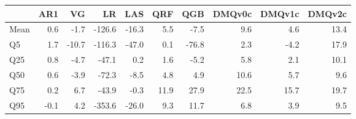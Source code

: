 \begin{tabular}{lrrrrrrrrr}
\toprule
 & AR1 & VG & LR & LAS & QRF & QGB & DMQv0c & DMQv1c & DMQv2c \\
\midrule
Mean & 0.6 & -1.7 & -126.6 & -16.3 & 5.5 & -7.5 & 9.6 & 4.6 & 13.4 \\
Q5 & 1.7 & -10.7 & -116.3 & -47.0 & 0.1 & -76.8 & 2.3 & -4.2 & 17.9 \\
Q25 & 0.8 & -4.7 & -47.1 & 0.2 & 1.6 & -5.2 & 5.8 & 2.1 & 10.1 \\
Q50 & 0.6 & -3.9 & -72.3 & -8.5 & 4.8 & 4.9 & 10.6 & 5.7 & 9.6 \\
Q75 & 0.2 & 6.7 & -43.9 & -0.3 & 11.9 & 27.9 & 22.5 & 15.7 & 19.7 \\
Q95 & -0.1 & 4.2 & -353.6 & -26.0 & 9.3 & 11.7 & 6.8 & 3.9 & 9.5 \\
\bottomrule
\end{tabular}
